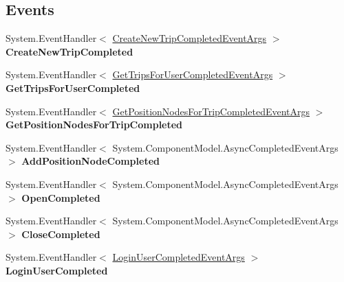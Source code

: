 \subsection*{Events}
\begin{DoxyCompactItemize}
\item 
\hypertarget{class_trip_service_client_ac17ec59fedb59ea7d5ad94e2bea941a6}{
System.EventHandler$<$ \hyperlink{class_create_new_trip_completed_event_args}{CreateNewTripCompletedEventArgs} $>$ {\bfseries CreateNewTripCompleted}}
\label{class_trip_service_client_ac17ec59fedb59ea7d5ad94e2bea941a6}

\item 
\hypertarget{class_trip_service_client_a52fb61fc0e92f991ea0c73138c37cfd0}{
System.EventHandler$<$ \hyperlink{class_get_trips_for_user_completed_event_args}{GetTripsForUserCompletedEventArgs} $>$ {\bfseries GetTripsForUserCompleted}}
\label{class_trip_service_client_a52fb61fc0e92f991ea0c73138c37cfd0}

\item 
\hypertarget{class_trip_service_client_a1f66b7244bee31e644d636b0769ab4e5}{
System.EventHandler$<$ \hyperlink{class_get_position_nodes_for_trip_completed_event_args}{GetPositionNodesForTripCompletedEventArgs} $>$ {\bfseries GetPositionNodesForTripCompleted}}
\label{class_trip_service_client_a1f66b7244bee31e644d636b0769ab4e5}

\item 
\hypertarget{class_trip_service_client_a5575f9d42ea11b00e78c14de8d718178}{
System.EventHandler$<$ System.ComponentModel.AsyncCompletedEventArgs $>$ {\bfseries AddPositionNodeCompleted}}
\label{class_trip_service_client_a5575f9d42ea11b00e78c14de8d718178}

\item 
\hypertarget{class_trip_service_client_aba32049c46c56af5f9fe154c088ad1d3}{
System.EventHandler$<$ System.ComponentModel.AsyncCompletedEventArgs $>$ {\bfseries OpenCompleted}}
\label{class_trip_service_client_aba32049c46c56af5f9fe154c088ad1d3}

\item 
\hypertarget{class_trip_service_client_ac13fec7035d647da839e607a036a1123}{
System.EventHandler$<$ System.ComponentModel.AsyncCompletedEventArgs $>$ {\bfseries CloseCompleted}}
\label{class_trip_service_client_ac13fec7035d647da839e607a036a1123}

\item 
\hypertarget{class_trip_service_client_a6dbf6162a69cf7e567357316096280a8}{
System.EventHandler$<$ \hyperlink{class_login_user_completed_event_args}{LoginUserCompletedEventArgs} $>$ {\bfseries LoginUserCompleted}}
\label{class_trip_service_client_a6dbf6162a69cf7e567357316096280a8}


\end{DoxyCompactItemize}
